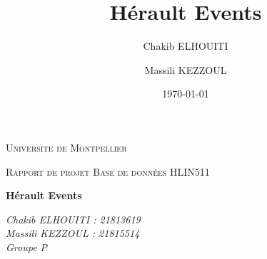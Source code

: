 \documentclass[oneside,11pt,a4paper]{article}
\title{Hérault Events}
\author{
    Chakib ELHOUITI \and
    Massili KEZZOUL 
}
\date{\today}
\begin{document}
\begin{titlepage}
	\centering
	{\scshape\LARGE Universite de Montpellier\par}
	{\scshape\Large Rapport de projet Base de données HLIN511\par}
	\vspace{1.5cm}
	{\huge\bfseries Hérault Events\par}
	\vspace{2cm}
	
	{\Large\itshape
		Chakib ELHOUITI : 21813619\\
		Massili KEZZOUL : 21815514\\
		Groupe P \\
		\par}

	\vspace{2cm}
	

\end{titlepage}
\end{document}
